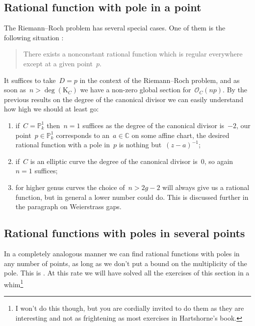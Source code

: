 \documentclass[10pt,a4paper]{article}
\begin{document}
\subsection{Rational function with pole in a point}
The Riemann--Roch problem has several special cases. One of them is the following situation \cite[exercise IV.1.1]{hartshorne-algebraic-geometry}:
\begin{quote}
  There exists a nonconstant rational function which is regular everywhere except at a given point~$p$.
\end{quote}
It suffices to take~$D=p$ in the context of the Riemann--Roch problem, and as soon as~$n>\deg(\mathrm{K}_C)$ we have a non-zero global section for~$\mathcal{O}_C(np)$. By the previous results on the degree of the canonical divisor we can easily understand how high we should at least go:
\begin{enumerate}
  \item if~$C=\mathbb{P}_k^1$ then~$n=1$ suffices as the degree of the canonical divisor is~$-2$, our point~$p\in\mathbb{P}_k^1$ corresponds to an~$a\in\mathbb{C}$ on some affine chart, the desired rational function with a pole in~$p$ is nothing but~$(z-a)^{-1}$;
  \item if~$C$ is an elliptic curve the degree of the canonical divisor is~$0$, so again~$n=1$ suffices;
  \item for higher genus curves the choice of~$n>2g-2$ will always give us a rational function, but in general a lower number could do. This is discussed further in the paragraph on Weierstrass gaps.
\end{enumerate}

\subsection{Rational functions with poles in several points}
In a completely analogous manner we can find rational functions with poles in any number of points, as long as we don't put a bound on the multiplicity of the pole. This is \cite[exercise IV.1.2]{hartshorne-algebraic-geometry}. At this rate we will have solved all the exercises of this section in a whim\footnote{I won't do this though, but you are cordially invited to do them as they are interesting and not as frightening as most exercises in Hartshorne's book.}
\end{document}
